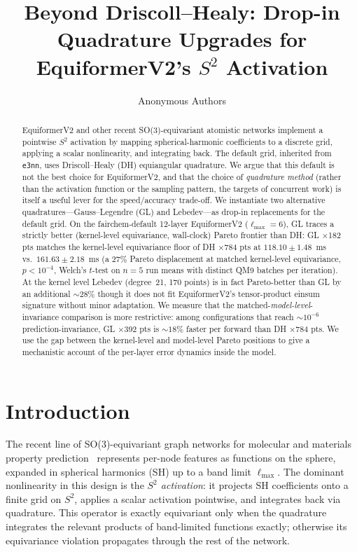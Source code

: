 \documentclass{article}
\title{Beyond Driscoll--Healy: Drop-in Quadrature Upgrades for EquiformerV2's
$S^2$ Activation}
\author{%
  Anonymous Authors\\
}
\begin{document}
\maketitle

\begin{abstract}
EquiformerV2 and other recent SO(3)-equivariant atomistic networks
implement a pointwise $S^2$ activation by mapping spherical-harmonic
coefficients to a discrete grid, applying a scalar nonlinearity, and
integrating back. The default grid, inherited from \texttt{e3nn},
uses Driscoll--Healy (DH) equiangular quadrature. We argue that this
default is not the best choice for EquiformerV2, and that the choice
of \emph{quadrature method} (rather than the activation function or
the sampling pattern, the targets of concurrent work) is itself a
useful lever for the speed/accuracy trade-off. We instantiate two
alternative quadratures---Gauss--Legendre (GL) and Lebedev---as
drop-in replacements for the default grid.
On the fairchem-default 12-layer EquiformerV2 ($\ell_{\max}{=}6$),
GL traces a strictly better (kernel-level equivariance, wall-clock)
Pareto frontier than DH: GL ×182 pts matches the kernel-level
equivariance floor of DH ×784 pts at $118.10 \pm 1.48$~ms vs.\
$161.63 \pm 2.18$~ms (a 27\% Pareto displacement at matched
kernel-level equivariance, $p < 10^{-4}$, Welch's $t$-test on $n{=}5$
run means with distinct QM9 batches per iteration). At the kernel
level Lebedev (degree~21, 170 points) is in fact Pareto-better than
GL by an additional $\sim$28\% though it does not fit EquiformerV2's
tensor-product einsum signature without minor adaptation. We measure
that the matched-\emph{model-level}-invariance comparison is more
restrictive: among configurations that reach $\sim 10^{-6}$
prediction-invariance, GL ×392 pts is $\sim 18\%$ faster per forward
than DH ×784 pts. We use the gap between the kernel-level and
model-level Pareto positions to give a mechanistic account of the
per-layer error dynamics inside the model.
\end{abstract}

\section{Introduction}
\label{sec:intro}

The recent line of SO(3)-equivariant graph networks for molecular and
materials property prediction~\cite{scn,escn,equiformerv2} represents
per-node features as functions on the sphere, expanded in spherical
harmonics (SH) up to a band limit $\ell_{\max}$. The dominant
nonlinearity in this design is the \emph{$S^2$ activation}: it
projects SH coefficients onto a finite grid on $S^2$, applies a scalar
activation pointwise, and integrates back via quadrature. This operator
is exactly equivariant only when the quadrature integrates the relevant
products of band-limited functions exactly; otherwise its equivariance
violation propagates through the rest of the network.
\end{document}
